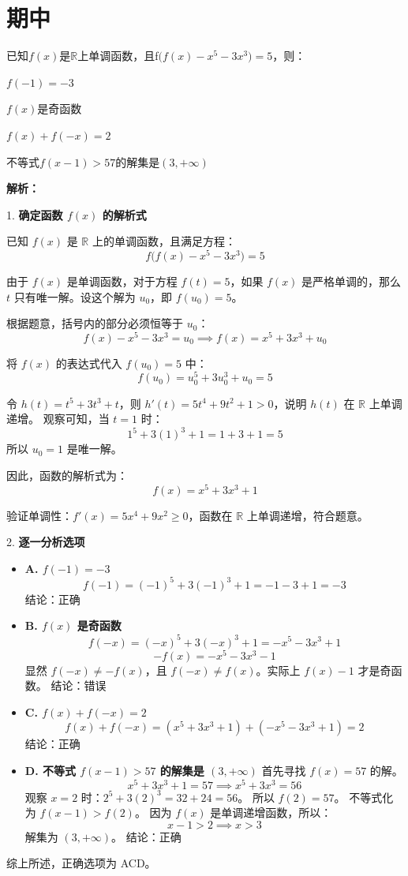 \documentclass[CJKmath,a4paper,10pt]{ctexart}
\begin{document}
\section{期中}
\begin{liti}
已知$f(x)$是$\mathbb{R}上单调函数，且$f$\big(f(x)-x^5-3x^3\big)=5$，则：
\begin{choices}
\item $f(-1)=-3$
\item $f(x)$是奇函数
\item $f(x)+f(-x)=2$
\item 不等式$f(x-1)>57$的解集是$(3,+\infty)$
\end{choices}
\tcblower
\textbf{解析：}

1. \textbf{确定函数 $f(x)$ 的解析式}

已知 $f(x)$ 是 $\mathbb{R}$ 上的单调函数，且满足方程：
\[ f\big(f(x)-x^5-3x^3\big)=5 \]

由于 $f(x)$ 是单调函数，对于方程 $f(t)=5$，如果 $f(x)$ 是严格单调的，那么 $t$ 只有唯一解。设这个解为 $u_0$，即 $f(u_0)=5$。

根据题意，括号内的部分必须恒等于 $u_0$：
\[ f(x) - x^5 - 3x^3 = u_0 \implies f(x) = x^5 + 3x^3 + u_0 \]

将 $f(x)$ 的表达式代入 $f(u_0)=5$ 中：
\[ f(u_0) = u_0^5 + 3u_0^3 + u_0 = 5 \]

令 $h(t) = t^5 + 3t^3 + t$，则 $h'(t) = 5t^4 + 9t^2 + 1 > 0$，说明 $h(t)$ 在 $\mathbb{R}$ 上单调递增。
观察可知，当 $t=1$ 时：
\[ 1^5 + 3(1)^3 + 1 = 1 + 3 + 1 = 5 \]
所以 $u_0 = 1$ 是唯一解。

因此，函数的解析式为：
\[ f(x) = x^5 + 3x^3 + 1 \]

验证单调性：$f'(x) = 5x^4 + 9x^2 \ge 0$，函数在 $\mathbb{R}$ 上单调递增，符合题意。

2. \textbf{逐一分析选项}

\begin{itemize}
    \item \textbf{A. $f(-1)=-3$}
    \[ f(-1) = (-1)^5 + 3(-1)^3 + 1 = -1 - 3 + 1 = -3 \]
    结论：正确

    \item \textbf{B. $f(x)$ 是奇函数}
    \[ f(-x) = (-x)^5 + 3(-x)^3 + 1 = -x^5 - 3x^3 + 1 \]
    \[ -f(x) = -x^5 - 3x^3 - 1 \]
    显然 $f(-x) \ne -f(x)$，且 $f(-x) \ne f(x)$。实际上 $f(x)-1$ 才是奇函数。
    结论：错误

    \item \textbf{C. $f(x)+f(-x)=2$}
    \[ f(x) + f(-x) = (x^5 + 3x^3 + 1) + (-x^5 - 3x^3 + 1) = 2 \]
    结论：正确

    \item \textbf{D. 不等式 $f(x-1)>57$ 的解集是 $(3,+\infty)$}
    首先寻找 $f(x)=57$ 的解。
    \[ x^5 + 3x^3 + 1 = 57 \implies x^5 + 3x^3 = 56 \]
    观察 $x=2$ 时：$2^5 + 3(2)^3 = 32 + 24 = 56$。
    所以 $f(2) = 57$。
    不等式化为 $f(x-1) > f(2)$。
    因为 $f(x)$ 是单调递增函数，所以：
    \[ x - 1 > 2 \implies x > 3 \]
    解集为 $(3, +\infty)$。
    结论：正确
\end{itemize}

综上所述，正确选项为 ACD。
\end{liti}
\end{document}
